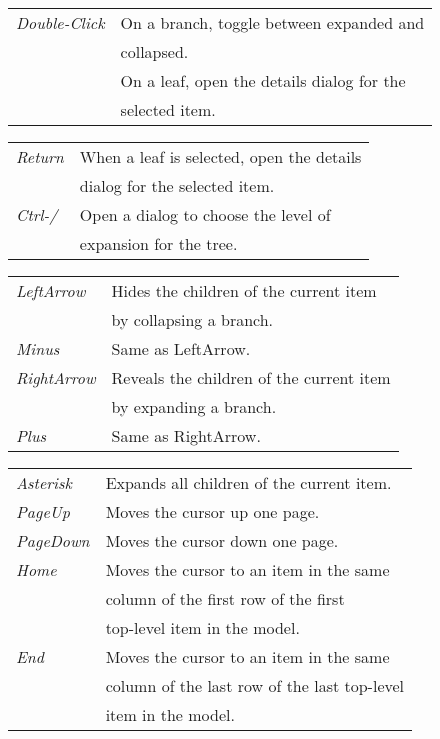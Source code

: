 \documentclass[9pt,landscape]{article}
\begin{document}
\begin{multicols}{3}
\begin{tabular}{@{}ll@{}}
\emph{Double-Click}
    & On a branch, toggle between expanded and \\
    & collapsed. \\
    & On a leaf, open the details dialog for the \\
    & selected item. \\
\end{tabular}
\begin{tabular}{@{}ll@{}}
\emph{Return}
    & When a leaf is selected, open the details \\
    & dialog for the selected item. \\
\emph{Ctrl-/}
    & Open a dialog to choose the level of \\
    & expansion for the tree. \\
\end{tabular}
\begin{tabular}{@{}ll@{}}
\emph{LeftArrow}
    & Hides the children of the current item \\
    & by collapsing a branch. \\
\emph{Minus}
    & Same as LeftArrow. \\
\emph{RightArrow}
    & Reveals the children of the current item \\
    & by expanding a branch. \\
\emph{Plus}
    & Same as RightArrow. \\
\end{tabular}
\begin{tabular}{@{}ll@{}}
\emph{Asterisk}
    & Expands all children of the current item. \\
\emph{PageUp}
    & Moves the cursor up one page. \\
\emph{PageDown}
    & Moves the cursor down one page. \\
\emph{Home}
    & Moves the cursor to an item in the same \\
    & column of the first row of the first \\
    & top-level item in the model. \\
\emph{End}
    & Moves the cursor to an item in the same \\
    & column of the last row of the last top-level \\
    & item in the model. \\
\end{tabular}



\end{multicols}
\end{document}
